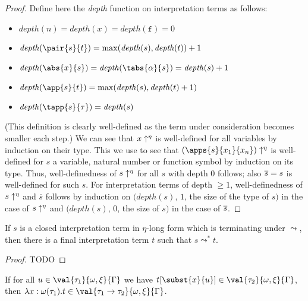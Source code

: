 \begin{proof}
Define here the \emph{depth} function on interpretation terms as
follows:
\begin{itemize}
\item $\mathit{depth}(n) = \mathit{depth}(x) = \mathit{depth}(\mathtt{f})
  = 0$
\item $\mathit{depth}(\pair{s}{t}) = \max(\mathit{depth}(s),\mathit{
  depth}(t)) + 1$
\item $\mathit{depth}(\abs{x}{s}) = \mathit{depth}(\tabs{\alpha}{s}) =
  \mathit{depth}(s) + 1$
\item $\mathit{depth}(\app{s}{t}) = \max(\mathit{depth}(s),\mathit{
  depth}(t)+1)$
\item $\mathit{depth}(\tapp{s}{\tau}) = \mathit{depth}(s)$
\end{itemize}
(This definition is clearly well-defined as the term under consideration
becomes smaller each step.)
We can see that $x\uparrow^\eta$ is well-defined for all variables by
induction on their type.  This we use to see that $\etalong{(\apps{s}{
x_1}{x_n})}$ is well-defined for $s$ a variable, natural number or
function symbol by induction on its type.  Thus, well-definedness of
$s\uparrow^\eta$ for all $s$ with depth $0$ follows; also $\overline{
s} = s$ is well-defined for such $s$.
For interpretation terms of depth $\geq 1$, well-definedness of
$s\uparrow^\eta$ and $\overline{s}$ follows by induction on
$(\mathit{depth}(s)$, $1$, the size of the type of $s)$ in the case
of $s\uparrow^\eta$ and
$(\mathit{depth}(s)$, $0$, the size of $s)$ in the case of
$\overline{s}$.
\end{proof}

\begin{lemma}
If $s$ is a closed interpretation term in $\eta$-long form which is
terminating under $\leadsto$, then there is a final interpretation term
$t$ such that $s \leadsto^* t$.
\end{lemma}

\begin{proof}
TODO
\end{proof}


\begin{lemma}
 If for all $u \in \val{\tau_1}{\omega,\xi}{\Gamma}$ we have
 $t[\subst{x}{u}] \in \val{\tau_2}{\omega,\xi}{\Gamma}$, then
 $\lambda x : \omega(\tau_1) . t \in
 \val{\tau_1\to\tau_2}{\omega,\xi}{\Gamma}$.
\end{lemma}

